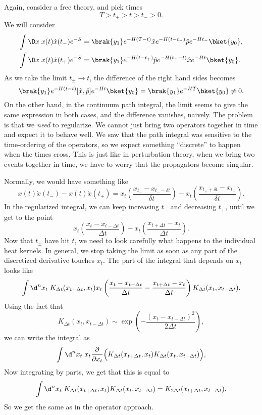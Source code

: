 \documentclass[a4paper]{article}
\begin{document}
Again, consider a free theory, and pick times
\[
  T > t_+ > t > t_- > 0.
\]
We will consider
\begin{align*}
  \int \D x\; x(t) \dot{x}(t_-) e^{-S} &= \brak{y_1} e^{-H(T - t)} \hat{x} e^{-H(t - t_-)} \hat{p} e^{-H t_-} \bket{y_0},\\
  \int \D x\; x(t) \dot{x}(t_+) e^{-S} &= \brak{y_1} e^{-H(t - t_+)} \hat{p} e^{-H (t_+ - t)} \hat{x} e^{-Ht}\bket{y_0}.
\end{align*}
As we take the limit $t_{\pm} \to t$, the difference of the right hand sides becomes
\[
  \brak{y_1} e^{-H(t - t) }[\hat{x}, \hat{p}] e^{-H t}\bket{y_0} = \brak{y_1} e^{-HT} \bket{y_0} \not= 0.
\]
On the other hand, in the continuum path integral, the limit seems to give the same expression in both cases, and the difference vanishes, naively. The problem is that we \emph{need} to regularize. We cannot just bring two operators together in time and expect it to behave well. We saw that the path integral was sensitive to the time-ordering of the operators, so we expect something ``discrete'' to happen when the times cross. This is just like in perturbation theory, when we bring two events together in time, we have to worry that the propagators become singular.

Normally, we would have something like
\[
  x(t) \dot{x}(t_-) - x(t) \dot{x}(t_+) = x_t \left(\frac{x_{t_-} - x_{t_- - \delta t}}{\delta t}\right) - x_t \left(\frac{x_{t_+ + \delta t} - x_{t_+}}{ \delta t}\right).
\]
In the regularized integral, we can keep increasing $t_-$ and decreasing $t_+$, until we get to the point
\[
  x_t \left(\frac{x_t - x_{t - \Delta t}}{\Delta t}\right) - x_t \left(\frac{x_{t + \Delta t} - x_t}{ \Delta t}\right).
\]
Now that $t_{\pm}$ have hit $t$, we need to look carefully what happens to the individual heat kernels. In general, we stop taking the limit as soon as any part of the discretized derivative touches $x_t$. The part of the integral that depends on $x_t$ looks like
\[
  \int \d^n x_t\; K_{\Delta t}(x_{t + \Delta t}, x_t) x_t \left(\frac{x_t - x_{t - \Delta t}}{\Delta t} - \frac{x_{t + \Delta t} - x_t}{ \Delta t}\right) K_{\Delta t} (x_t, x_{t - \Delta t}).
\]
Using the fact that
\[
  K_{\Delta t}(x_t, x_{t - \Delta t}) \sim \exp\left(- \frac{(x_t - x_{t - \Delta t})^2}{2\Delta t}\right),
\]
we can write the integral as
\[
  \int \d^n x_t \; x_t \frac{\partial}{\partial x_t} \Big(K_{\Delta t}(x_{t + \Delta t}, x_t) K_{\Delta t}(x_t, x_{t - \Delta t})\Big),
\]
Now integrating by parts, we get that this is equal to
\[
  \int \d^n x_t\; K_{\Delta t} (x_{t + \Delta t}, x_t) K_{\Delta t} (x_t, x_{t - \Delta t}) = K_{2 \Delta t} (x_{t + \Delta t}, x_{t - \Delta t}).
\]
So we get the same as in the operator approach.
\end{document}
